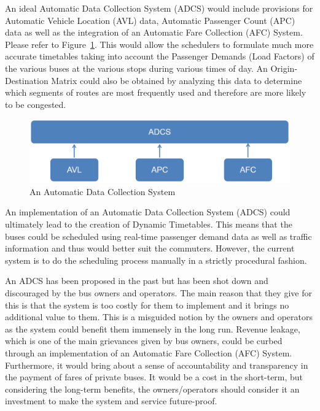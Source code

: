 \documentclass[12pt, oneside]{report}
\begin{document}
An ideal Automatic Data Collection System (ADCS) would include provisions for Automatic Vehicle Location (AVL) data, Automatic Passenger Count (APC) data as well as the integration of an Automatic Fare Collection (AFC) System. Please refer to Figure~\ref{image-ADCS}. This would allow the schedulers to formulate much more accurate timetables taking into account the Passenger Demands (Load Factors) of the various buses at the various stops during various times of day. An Origin-Destination Matrix could also be obtained by analyzing this data to determine which segments of routes are most frequently used and therefore are more likely to be congested.

\begin {figure} [h!]
\centering
\includegraphics[scale=0.6]{ADCS}
\caption [An Automatic Data Collection System] {An Automatic Data Collection System}
\label {image-ADCS}
\end {figure}

An implementation of an Automatic Data Collection System (ADCS) could ultimately lead to the creation of Dynamic Timetables. This means that the buses could be scheduled using real-time passenger demand data as well as traffic information and thus would better suit the commuters. However, the current system is to do the scheduling process manually in a strictly procedural fashion.

An ADCS has been proposed in the past but has been shot down and discouraged by the bus owners and operators. The main reason that they give for this is that the system is too costly for them to implement and it brings no additional value to them. This is a misguided notion by the owners and operators as the system could benefit them immensely in the long run. Revenue leakage, which is one of the main grievances given by bus owners, could be curbed through an implementation of an Automatic Fare Collection (AFC) System. Furthermore, it would bring about a sense of accountability and transparency in the payment of fares of private buses. It would be a cost in the short-term, but considering the long-term benefits, the owners/operators should consider it an investment to make the system and service future-proof.
\end{document}
